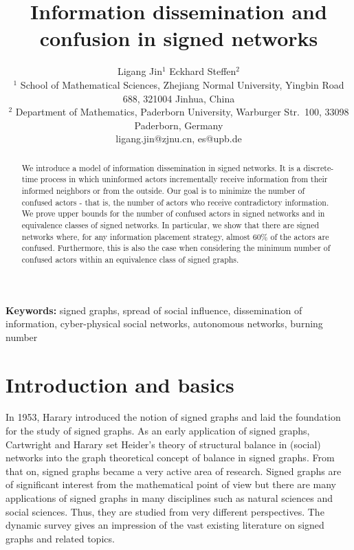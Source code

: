 \documentclass[a4paper,11pt]{article}
\title{Information dissemination and confusion in signed networks}
\author{Ligang Jin$^1$ Eckhard Steffen$^2$ \\
\footnotesize
$^1$ School of Mathematical Sciences, Zhejiang Normal University, Yingbin Road 688, 321004 Jinhua,
China\\
\footnotesize	$^2$ Department of Mathematics, Paderborn University, Warburger Str.\ 100, 33098 Paderborn,
		Germany
\\ \footnotesize ligang.jin@zjnu.cn, es@upb.de}
\date{}
\theoremstyle{remark}
\begin{document}
\maketitle

\begin{abstract}
We introduce a model of information dissemination in signed networks. It is a discrete-time process in which uninformed actors incrementally receive information from their informed neighbors or from the outside. Our goal is to minimize the number of confused actors - that is, the number of actors who receive contradictory information. 
We prove upper bounds for the number of confused actors in signed networks and 
in equivalence classes of signed networks.
In particular, we show that there are signed networks where, for any information placement 
strategy, almost 
60\% of the actors are confused. Furthermore, this is also the case when considering 
the minimum number of confused actors within an equivalence class of signed graphs.
\end{abstract}

{\bf Keywords:} signed graphs, spread of social influence, dissemination of information,
cyber-physical social networks, autonomous networks, burning number

\section{Introduction and basics}

In 1953, Harary \cite{Balance} introduced the notion of signed graphs
and laid the foundation for the study of signed graphs. 
As an early application of signed graphs,
Cartwright and Harary \cite{Cartwright_Harary_1956}  set Heider's theory \cite{Heider_1944} of structural balance in (social) networks into the graph theoretical concept of balance in signed graphs. 
From that on, signed graphs became a very active area of research.
Signed graphs are of significant interest from the mathematical point of view but there are many applications of signed graphs in 
many disciplines such as natural sciences and social sciences.
Thus, they are studied from very different perspectives.
The dynamic survey \cite{zaslavsky2012mathematical} gives an impression of the vast existing literature on signed graphs and related topics.
\end{document}
